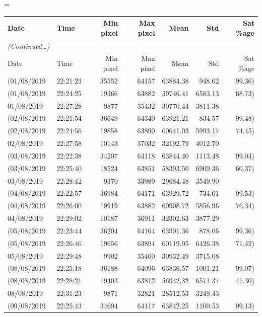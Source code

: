 \LTcapwidth=\linewidth
\begin{longtable}{llrrrrr} 
\hline
Date & Time & Min pixel & Max pixel & Mean & Std & Sat \%age \\ \hline
\endfirsthead
\hline
\textit{(Continued\ldots)}\\
Date & Time & Min pixel & Max pixel & Mean & Std & Sat \%age \\ \hline
\endhead
(01/08/2019 & 22:21:23 & 35552 & 64157 & 63884.38 & 948.02 & 99.36) \\
(01/08/2019 & 22:24:25 & 19366 & 63882 & 59746.41 & 6583.13 & 68.73) \\
01/08/2019 & 22:27:28 & 9877 & 35432 & 30770.44 & 3811.38 &  \\
(02/08/2019 & 22:21:54 & 36649 & 64340 & 63921.21 & 834.57 & 99.48) \\
(02/08/2019 & 22:24:56 & 19858 & 63890 & 60641.03 & 5993.17 & 74.45) \\
02/08/2019 & 22:27:58 & 10143 & 37032 & 32192.79 & 4012.70 &  \\
(03/08/2019 & 22:22:38 & 34207 & 64118 & 63844.40 & 1113.48 & 99.04) \\
(03/08/2019 & 22:25:40 & 18524 & 63851 & 58393.50 & 6909.36 & 60.37) \\
03/08/2019 & 22:28:42 & 9370 & 33989 & 29684.48 & 3549.90 &  \\
(04/08/2019 & 22:22:57 & 36984 & 64171 & 63929.72 & 734.61 & 99.53) \\
(04/08/2019 & 22:26:00 & 19919 & 63882 & 60908.72 & 5856.96 & 76.34) \\
04/08/2019 & 22:29:02 & 10187 & 36911 & 32302.63 & 3877.29 &  \\
(05/08/2019 & 22:23:44 & 36204 & 64164 & 63901.36 & 878.06 & 99.36) \\
(05/08/2019 & 22:26:46 & 19656 & 63894 & 60119.95 & 6426.38 & 71.42) \\
05/08/2019 & 22:29:48 & 9902 & 35460 & 30932.49 & 3715.08 &  \\
(08/08/2019 & 22:25:18 & 36188 & 64096 & 63836.57 & 1001.21 & 99.07) \\
(08/08/2019 & 22:28:21 & 19403 & 63812 & 56942.32 & 6571.37 & 41.30) \\
08/08/2019 & 22:31:23 & 9871 & 32821 & 28512.53 & 3249.43 &  \\
(09/08/2019 & 22:25:43 & 34694 & 64117 & 63842.25 & 1100.53 & 99.13) \\

\end{longtable}
